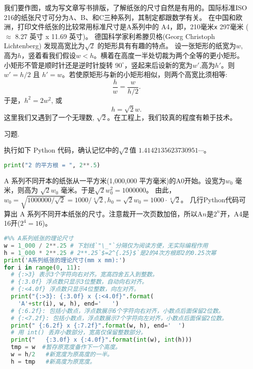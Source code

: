 我们要作图，或为写文章写书排版，了解纸张的尺寸自然是有用的。国际标准ISO 216的纸张尺寸可分为A、B、和C三种系列，其制定都跟数学有关。
在中国和欧洲，打印文件纸张的比较常用标准尺寸是A系列中的 A4，即，210毫米\texttt{x}{ }297毫米 ($\approx$ 8.27 英寸 x 11.69 英寸)。
 德国科学家利希滕贝格(Georg Christoph Lichtenberg) 发现高宽比为$\sqrt{2}$
的矩形具有有趣的特点。
设一张矩形的纸宽为$w$,高为$h$，竖着看我们假设$w <h$。横着在高度一半处切裁为两个全等的更小矩形。小矩形不管是顺时针还是逆时针旋转 $90^\circ$，竖起来后设新的宽为$w'$,高为$h'$。则
$w' = h/2$ 且 $h' = w$。若使原矩形与新的小矩形相似，则两个高宽比须相等:
$$\frac{h}{w} = \frac{w}{h/2}.   $$
于是，$h^2= 2 w^2$, 或
 $$h= \sqrt{2} w.$$
这里我们又遇到了一个无理数, $\sqrt{2}$。在工程上，我们较真的程度有赖于技术。
	
\begin{kaishu}习题.\end{kaishu} 执行如下 Python 代码，确认记忆中的$\sqrt{2}$值 $1.4142135623730951\cdots$。
\begin{spacing}{0.8}
	\begin{small}
	\begin{lstlisting}[language=Python]
print("2 的平方根 = ", 2**.5)
\end{lstlisting}
\end{small}
\end{spacing}

A 系列不同开本的纸张从一平方米(1,000,000 平方毫米)的A0开始。设宽为$w_0$ 毫米，则高为
$\sqrt{2}w_0$ 毫米。于是$\sqrt{2}w_0^2 = 1000000$。
由此，
$w_0 = \sqrt{1000000/\sqrt{2}}=1000/\sqrt[4]{2}, 
h_0=\sqrt{2}w_0=1000\cdot\sqrt[4]{2}$。
几行Python代码可算出 A 系列不同开本纸张的尺寸。注意裁开一次页数加倍，所以A$n$是$2^n$开，A4是16开($2^4=16$)。

\vspace{.4cm}
\begin{spacing}{0.8}
	\begin{small}
	\begin{lstlisting}[language=Python]
#%% A系列纸张的理论尺寸
w = 1_000 / 2**.25 # 下划线`"\_"`分隔仅为阅读方便，无实际编程作用
h = 1_000 * 2**.25 # 2**.25`$=2^{.25}$`是2的4次方根即2的0.25次幂
print('A系列纸张的理论尺寸(mm x mm):')
for i in range(0, 11):
  # {:>3} 表示3个字符向右对齐。宽高四舍五入到整数。
  # {:3.0f} 浮点数只显示3位整数，自动向右对齐。
  # {:<4.0f} 浮点数只显示4位整数，向左对齐。
  print("{:>3}: {:3.0f} x {:<4.0f}".format(
    'A'+str(i), w, h), end='   ')
  # {:6.2f}: 包括小数点，浮点数展示6个字符向右对齐，小数点后面保留2位数。
  # {:<7.2f}: 包括小数点，浮点数展示7个字符向左对齐，小数点后面保留2位数。
  print(" {:6.2f} x {:7.2f}".format(w, h), end='  ')
  # 用 int() 丢弃小数部分，宽高仅保留整数部分。
  print("   {:3.0f} x {:4.0f}".format(int(w), int(h)))
  tmp = w  #暂存原宽度备作下一个高度。
  w = h/2   #新宽度为原高度的一半。
  h = tmp   #新高度为原宽度。
\end{lstlisting}
\end{small}
\end{spacing}
\vspace{.4cm}\label{a_paper_py}

